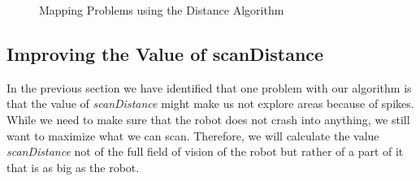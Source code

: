 \documentclass[twoside, 12pt]{article}
\begin{document}
\begin{figure}
\vspace{-28pt}
  \begin{center}
  \end{center}
\vspace{-20pt}
  \caption{Mapping Problems using the Distance Algorithm}
  \label{fig:firstMappingProblems}
\vspace{20pt}
\end{figure}

\begin{figure}
\vspace{-50pt}
\end{figure}

\subsection{Improving the Value of scanDistance}
\label{sec:improvingValueOfScanDistance
}

In the previous section we have identified that one problem with our algorithm is that the value of \textit{scanDistance} might make us not explore areas because of spikes. While we need to make sure that the robot does not crash into anything, we still want to maximize what we can scan. Therefore, we will calculate the value \textit{scanDistance} not of the full field of vision of the robot but rather of a part of it that is as big as the robot.\\
\end{document}
